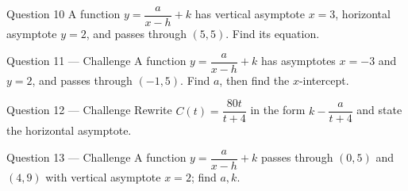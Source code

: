 \documentclass[11pt]{article}
\begin{document}
\begin{qbox}{Question 10}
A function $y=\dfrac{a}{x-h}+k$ has vertical asymptote $x=3$, horizontal asymptote $y=2$, and passes through $(5,5)$. Find its equation.\workspace{2.4cm}
\end{qbox}

\begin{qbox}{Question 11 --- Challenge}
A function $y=\dfrac{a}{x-h}+k$ has asymptotes $x=-3$ and $y=2$, and passes through $(-1,5)$. Find $a$, then find the $x$-intercept.\workspace{3.4cm}
\end{qbox}

\begin{qbox}{Question 12 --- Challenge}
Rewrite $C(t)=\dfrac{80t}{t+4}$ in the form $k-\dfrac a{t+4}$ and state the horizontal asymptote.\workspace{3.2cm}
\end{qbox}

\begin{qbox}{Question 13 --- Challenge}
A function $y=\dfrac{a}{x-h}+k$ passes through $(0,5)$ and $(4,9)$ with vertical asymptote $x=2$; find $a,k$.\workspace{3.4cm}
\end{qbox}

\clearpage
{}
\end{document}
